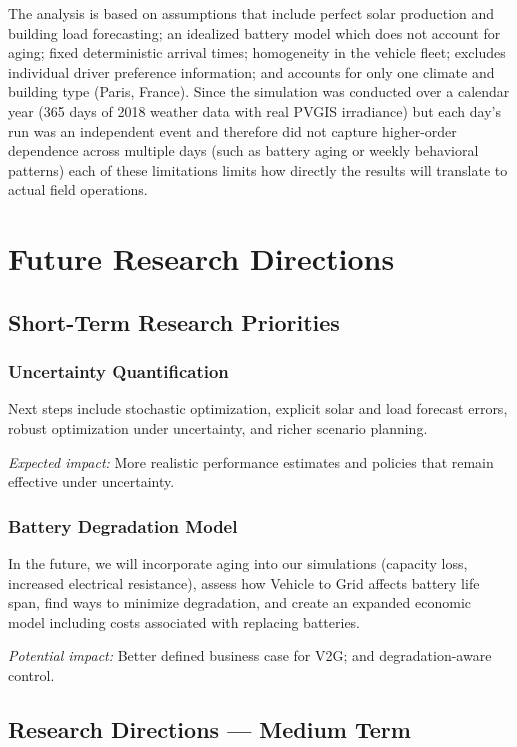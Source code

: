 The analysis is based on assumptions that include perfect solar production and building load forecasting; an idealized battery model which does not account for aging; fixed deterministic arrival times; homogeneity in the vehicle fleet; excludes individual driver preference information; and accounts for only one climate and building type (Paris, France). Since the simulation was conducted over a calendar year (365 days of 2018 weather data with real PVGIS irradiance) but each day’s run was an independent event and therefore did not capture higher-order dependence across multiple days (such as battery aging or weekly behavioral patterns) each of these limitations limits how directly the results will translate to actual field operations.
\section{Future Research Directions}
\label{sec:future_work}

\subsection{Short-Term Research Priorities}
\label{subsec:short_term}

\subsubsection{Uncertainty Quantification}

Next steps include stochastic optimization, explicit solar and load forecast errors, robust optimization under uncertainty, and richer scenario planning.

\textit{Expected impact:} More realistic performance estimates and policies that remain effective under uncertainty.

\subsubsection{Battery Degradation Model}
In the future, we will incorporate aging into our simulations (capacity loss, increased electrical resistance), assess how Vehicle to Grid affects battery life span, find ways to minimize degradation, and create an expanded economic model including costs associated with replacing batteries.

\textit{Potential impact:} Better defined business case for V2G; and degradation-aware control.

\subsection{Research Directions — Medium Term}
\label{subsec:medium_term}

